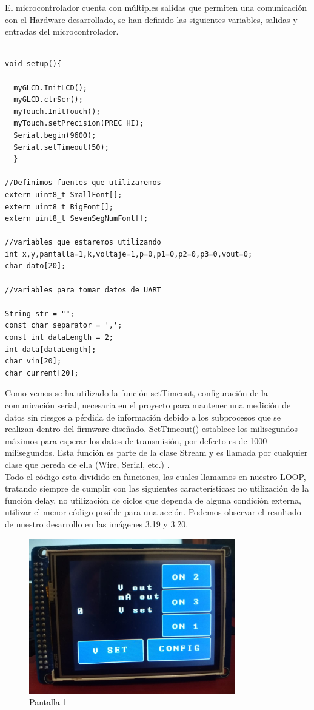 El microcontrolador cuenta con múltiples salidas que permiten una comunicación con el Hardware desarrollado, se han definido las siguientes variables, salidas y entradas del microcontrolador.

\begin{verbatim}

void setup(){

  myGLCD.InitLCD();
  myGLCD.clrScr();
  myTouch.InitTouch();
  myTouch.setPrecision(PREC_HI);
  Serial.begin(9600);
  Serial.setTimeout(50);
  }

//Definimos fuentes que utilizaremos
extern uint8_t SmallFont[];
extern uint8_t BigFont[];
extern uint8_t SevenSegNumFont[];

//variables que estaremos utilizando
int x,y,pantalla=1,k,voltaje=1,p=0,p1=0,p2=0,p3=0,vout=0;
char dato[20];

//variables para tomar datos de UART

String str = "";
const char separator = ',';
const int dataLength = 2;
int data[dataLength];
char vin[20];
char current[20];

\end{verbatim}

Como vemos se ha utilizado la función setTimeout, configuración de la comunicación serial, necesaria en el proyecto para mantener una medición de datos sin riesgos a pérdida de información debido a los subprocesos que se realizan dentro del firmware diseñado. SetTimeout() establece los milisegundos máximos para esperar los datos de transmisión, por defecto es de 1000 milisegundos. Esta función es parte de la clase Stream y es llamada por cualquier clase que hereda de ella (Wire, Serial, etc.) \cite{settime}.\\


Todo el código esta dividido en funciones, las cuales llamamos en nuestro LOOP, tratando siempre de cumplir con las siguientes características: no utilización de la función delay, no utilización de ciclos que dependa de alguna condición externa, utilizar el menor código posible para una acción. Podemos observar el resultado de nuestro desarrollo en las imágenes 3.19 y 3.20.\\

\begin{figure}[H]
\centering
\includegraphics[width=9cm]{Capitulo3/figs/pantalla1.jpg}
\caption{Pantalla 1}
\end{figure}

